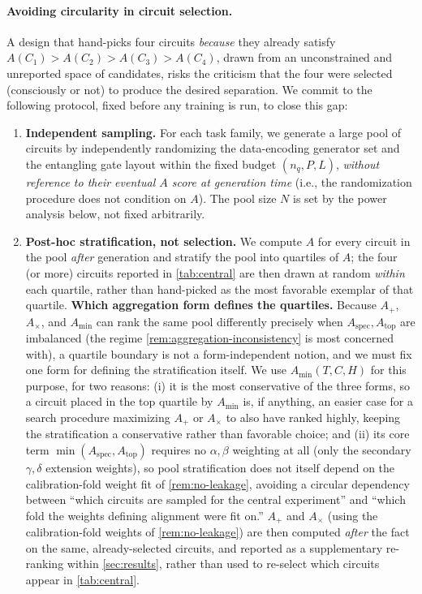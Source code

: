 \documentclass[11pt]{article}
\newcommand{\Aspec}{A_{\mathrm{spec}}}
\newcommand{\Atop}{A_{\mathrm{top}}}
\begin{document}
\paragraph{Avoiding circularity in circuit selection.} A design that hand-picks four circuits \emph{because} they already satisfy $A(C_1)>A(C_2)>A(C_3)>A(C_4)$, drawn from an unconstrained and unreported space of candidates, risks the criticism that the four were selected (consciously or not) to produce the desired separation. We commit to the following protocol, fixed before any training is run, to close this gap:
\begin{enumerate}[leftmargin=1.8em]
    \item \textbf{Independent sampling.} For each task family, we generate a large pool of circuits by independently randomizing the data-encoding generator set and the entangling gate layout within the fixed budget $(n_q, P, L)$, \emph{without reference to their eventual $A$ score at generation time} (i.e., the randomization procedure does not condition on $A$). The pool size $N$ is set by the power analysis below, not fixed arbitrarily.
    \item \textbf{Post-hoc stratification, not selection.} We compute $A$ for every circuit in the pool \emph{after} generation and stratify the pool into quartiles of $A$; the four (or more) circuits reported in \cref{tab:central} are then drawn at random \emph{within} each quartile, rather than hand-picked as the most favorable exemplar of that quartile. \textbf{Which aggregation form defines the quartiles.} Because $A_+$, $A_\times$, and $A_{\min}$ can rank the same pool differently precisely when $\Aspec,\Atop$ are imbalanced (the regime \cref{rem:aggregation-inconsistency} is most concerned with), a quartile boundary is not a form-independent notion, and we must fix one form for defining the stratification itself. We use $A_{\min}(T,C,H)$ for this purpose, for two reasons: (i) it is the most conservative of the three forms, so a circuit placed in the top quartile by $A_{\min}$ is, if anything, an easier case for a search procedure maximizing $A_+$ or $A_\times$ to also have ranked highly, keeping the stratification a conservative rather than favorable choice; and (ii) its core term $\min(\Aspec,\Atop)$ requires no $\alpha,\beta$ weighting at all (only the secondary $\gamma,\delta$ extension weights), so pool stratification does not itself depend on the calibration-fold weight fit of \cref{rem:no-leakage}, avoiding a circular dependency between ``which circuits are sampled for the central experiment'' and ``which fold the weights defining alignment were fit on.'' $A_+$ and $A_\times$ (using the calibration-fold weights of \cref{rem:no-leakage}) are then computed \emph{after} the fact on the same, already-selected circuits, and reported as a supplementary re-ranking within \cref{sec:results}, rather than used to re-select which circuits appear in \cref{tab:central}.

\end{enumerate}
\end{document}
